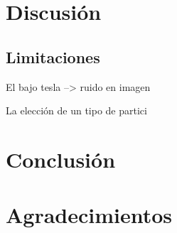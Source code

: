 \documentclass[fleqn,10pt]{UICArticle} %
\begin{document}
\section{Discusión}

\subsection{Limitaciones}

\begin{list}{-}{spacing}
\item El bajo tesla --> ruido en imagen
\item La elección de un tipo de partici
\end{list}

\section{Conclusión}


\section*{Agradecimientos}





\end{document}
